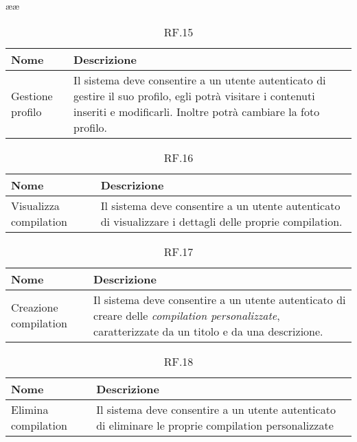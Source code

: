 ææ\documentclass{natourDoc}
\begin{document}
	\begin{table}[H]
		\centering
		\begin{tabular}{ |p{5cm}|p{10.3cm}| } 
			\hline
			\rowcolor{PineGreen!70}
			\textbf{Nome} & \textbf{Descrizione} \\
			\hline
			Gestione profilo &  Il sistema deve consentire a un utente autenticato di gestire il suo profilo, 
			egli potrà visitare i contenuti inseriti e modificarli. Inoltre potrà cambiare la foto profilo. \\
			\hline
		\end{tabular}
		\caption{RF.15}
		\label{table:15}
	\end{table}
	

	\begin{table}[H]
		\centering
		\begin{tabular}{ |p{5cm}|p{10.3cm}| }
			\hline
			\rowcolor{PineGreen!70}
			\textbf{Nome} & \textbf{Descrizione} \\
			\hline
			Visualizza compilation & Il sistema deve consentire a un utente autenticato di visualizzare i dettagli
			delle proprie compilation.  \\
			\hline
		\end{tabular}
		\caption{RF.16}
		\label{table:16}
	\end{table}

	\begin{table}[H]
		\centering
		\begin{tabular}{ |p{5cm}|p{10.3cm}| }
			\hline
			\rowcolor{PineGreen!70}
			\textbf{Nome} & \textbf{Descrizione} \\
			\hline
			Creazione compilation & Il sistema deve consentire a un utente autenticato di creare delle \textit{compilation personalizzate},
			caratterizzate da un titolo e da una descrizione. \\
			\hline
		\end{tabular}
		\caption{RF.17}
		\label{table:17}
	\end{table}

	\begin{table}[H]
		\centering
		\begin{tabular}{ |p{5cm}|p{10.3cm}| }
			\hline
			\rowcolor{PineGreen!70}
			\textbf{Nome} & \textbf{Descrizione} \\
			\hline
			Elimina compilation & Il sistema deve consentire a un utente autenticato di eliminare le proprie
			compilation personalizzate \\
			\hline
		\end{tabular}
		\caption{RF.18}
		\label{table:18}
	\end{table}
	
\end{document}
